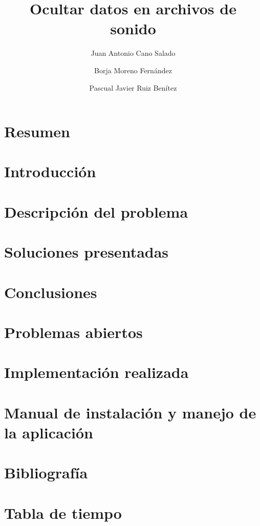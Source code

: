 \documentclass[12pt]{article}
\title{Ocultar datos en archivos de sonido}
\author{Juan Antonio Cano Salado \and Borja Moreno Fernández \and Pascual Javier Ruiz Benítez}
\begin{document}
\maketitle

\newpage
\tableofcontents

\newpage
\section{Resumen}

\newpage
\section{Introducción}

\newpage
\section{Descripción del problema}

\newpage
\section{Soluciones presentadas}

\newpage
\section{Conclusiones}

\newpage
\section{Problemas abiertos}

\newpage
\section{Implementación realizada}

\newpage
\section{Manual de instalación y manejo de la aplicación}

\newpage
\section{Bibliografía}

\newpage
\section{Tabla de tiempo}
\end{document}
